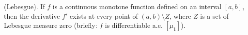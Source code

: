 (Lebesgue). If $f$ is a continuous monotone function defined on an interval $[a, b]$, then the derivative $f'$ exists at every point of $(a, b) \setminus Z$, where $Z$ is a set of Lebesgue measure zero (briefly: $f$ is differentiable a.e. $[\mu_1]$).
